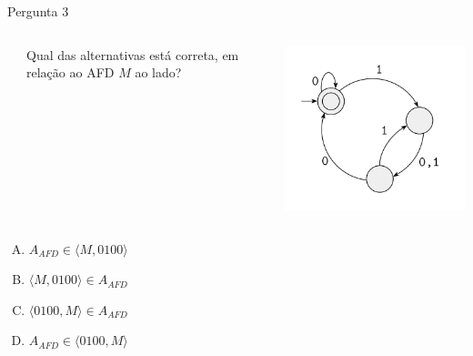 \documentclass[xcolor=dvipsnames,table]{beamer}
\begin{document}
	\begin{frame}
		\begin{block}{Pergunta 3}
			\begin{columns}
				\begin{column}{0.05\textwidth}\end{column}
				\begin{column}{0.45\textwidth}
					Qual das alternativas está correta, em relação ao AFD $M$ ao lado?
				\end{column}
				\begin{column}{0.5\textwidth}  %
					\begin{center}
						\includegraphics[width=.7\textwidth]{images/afd}
					\end{center}
				\end{column}
			\end{columns}
			\begin{center}
				
			\end{center}
		\end{block}
		\begin{enumerate}[(A)]
			\item $A_{AFD} \in \langle M, 0100 \rangle$
			\item $\langle M, 0100 \rangle \in A_{AFD}$ 
			\item $\langle 0100, M \rangle \in A_{AFD}$
			\item $A_{AFD} \in \langle 0100, M \rangle$
		\end{enumerate}
	\end{frame}

	\begin{frame}
		\titlepage
	\end{frame}
	
\end{document}
